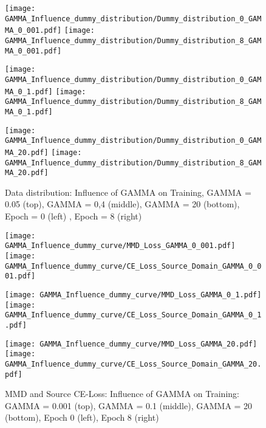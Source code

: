 \begin{figure}[H]
  \centering
  \texttt{[image: GAMMA\_Influence\_dummy\_distribution/Dummy\_distribution\_0\_GAMMA\_0\_001.pdf]}
  \hspace{.4cm}
  \texttt{[image: GAMMA\_Influence\_dummy\_distribution/Dummy\_distribution\_8\_GAMMA\_0\_001.pdf]}

  \vspace{.1cm}

  \texttt{[image: GAMMA\_Influence\_dummy\_distribution/Dummy\_distribution\_0\_GAMMA\_0\_1.pdf]}
  \hspace{.4cm}
  \texttt{[image: GAMMA\_Influence\_dummy\_distribution/Dummy\_distribution\_8\_GAMMA\_0\_1.pdf]}

  \vspace{.1cm}

  \texttt{[image: GAMMA\_Influence\_dummy\_distribution/Dummy\_distribution\_0\_GAMMA\_20.pdf]}
  \hspace{.4cm}
  \texttt{[image: GAMMA\_Influence\_dummy\_distribution/Dummy\_distribution\_8\_GAMMA\_20.pdf]}
 

  \caption{Data distribution: Influence of GAMMA on Training, GAMMA = 0.05 (top), GAMMA = 0,4 (middle), GAMMA = 20 (bottom), Epoch = 0 (left) , Epoch = 8 (right)}
  \label{fig:point_cloud_mmd}
\end{figure}





\begin{figure}[H]
  \centering
  \texttt{[image: GAMMA\_Influence\_dummy\_curve/MMD\_Loss\_GAMMA\_0\_001.pdf]}
  \hspace{.3cm}
  \texttt{[image: GAMMA\_Influence\_dummy\_curve/CE\_Loss\_Source\_Domain\_GAMMA\_0\_001.pdf]}

  \vspace{.1cm}

  \texttt{[image: GAMMA\_Influence\_dummy\_curve/MMD\_Loss\_GAMMA\_0\_1.pdf]}
  \hspace{.3cm}
  \texttt{[image: GAMMA\_Influence\_dummy\_curve/CE\_Loss\_Source\_Domain\_GAMMA\_0\_1.pdf]}

  \vspace{.1cm}

  \texttt{[image: GAMMA\_Influence\_dummy\_curve/MMD\_Loss\_GAMMA\_20.pdf]}
  \hspace{.1cm}
  \texttt{[image: GAMMA\_Influence\_dummy\_curve/CE\_Loss\_Source\_Domain\_GAMMA\_20.pdf]}

  \caption{MMD and Source CE-Loss: Influence of GAMMA on Training: GAMMA = 0.001 (top), GAMMA = 0.1 (middle), GAMMA = 20 (bottom), Epoch 0 (left), Epoch 8 (right)}
  \label{fig:learning_curves_influence_mmd_feature_extractor}
\end{figure}

